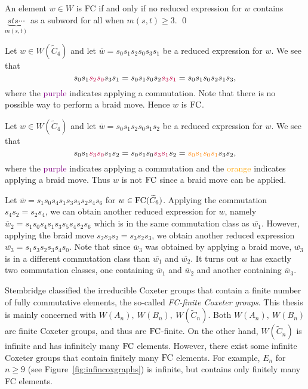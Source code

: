 \begin{theorem}
	An element $w \in W$ is FC if and only if no reduced expression for $w$ contains $\underbrace{sts\cdots}_{m(s,t)}$ as a subword for all when $m(s,t) \geq 3$. \qed
\end{theorem}

\begin{example}
	Let $w \in W(\widetilde{C}_4)$ and let $\overline{w}=s_0s_1s_2s_0s_3s_1$ be a reduced expression for $w$. We see that
	\[s_0s_1\textcolor{purple}{s_2s_0}s_3s_1=s_0s_1s_0s_2\textcolor{purple}{s_3s_1}=s_0s_1s_0s_2s_1s_3,\]
	where the \textcolor{purple}{purple} indicates applying a commutation. Note that there is no possible way to perform a braid move. Hence $w$ is $\mathrm{FC}$.
\end{example}

\begin{example}
Let $w \in W(\widetilde{C}_4)$ and let $\overline{w}=s_0s_1s_2s_0s_1s_2$ be a reduced expression for $w$. We see that
\[s_0s_1\textcolor{purple}{s_3s_0}s_1s_2=s_0s_1s_0\textcolor{purple}{s_3s_1}s_2=\textcolor{orange}{s_0s_1s_0s_1}s_3s_2,\]
where the \textcolor{purple}{purple} indicates applying a commutation and the \textcolor{orange}{orange} indicates applying a braid move. Thus $w$ is not $\mathrm{FC}$ since a braid move can be applied.  	
\end{example}

\begin{example}
Let $\overline{w}=s_1s_0s_4s_1s_3s_5s_2s_4s_6$ for $w \in \mathrm{FC}(\widetilde{C}_6)$. Applying the commutation $s_4s_2=s_2s_4$, we can obtain another reduced expression for $w$, namely $\overline{w}_2=s_1s_0s_4s_1s_3s_5s_4s_2s_6$ which is in the same commutation class as $\overline{w_1}$. However, applying the braid move $s_2s_3s_2=s_3s_2s_3$, we obtain another reduced expression $\overline{w_3}=s_1s_3s_2s_3s_4s_0$. Note that since $\overline{w}_3$ was obtained by applying a braid move, $\overline{w_3}$ is in a different commutation class than $\overline{w_1}$ and $\overline{w_2}$. It turns out $w$ has exactly two commutation classes, one containing $\overline{w}_1$ and $\overline{w}_2$ and another containing $\overline{w}_3$.
\end{example}


Stembridge classified the irreducible Coxeter groups that contain a finite number of fully commutative elements, the so-called \emph{FC-finite Coxeter groups}. This thesis is mainly concerned with $W(A_n),~W(B_n),~W(\widetilde{C}_n)$. Both $W(A_n),~W(B_n)$ are finite Coxeter groups, and thus are $\mathrm{FC}$-finite. On the other hand, $W(\widetilde{C}_n)$ is infinite and has infinitely many $\mathrm{FC}$ elements. However, there exist some infinite Coxeter groups that contain finitely many $\mathrm{FC}$ elements. For example, $E_n$ for $n \geq 9$ (see Figure~\ref{fig:infincoxgraphs}) is infinite, but contains only finitely many FC elements.

